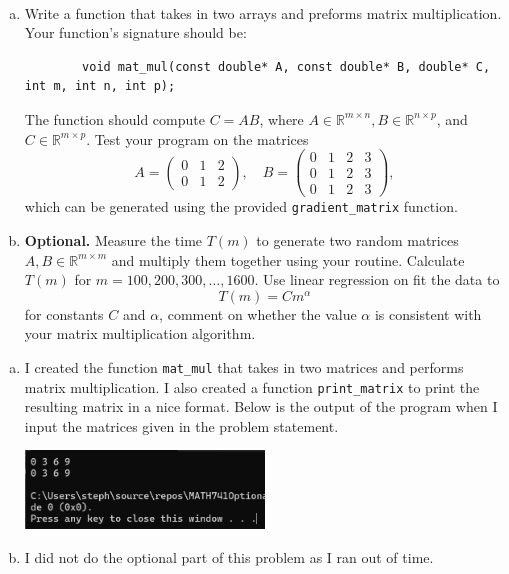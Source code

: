 \documentclass{article}
\def\rr{{\mathbb R}}
\begin{document}
\begin{problem} \\ 
    \begin{enumerate}[a)]
        \item Write a function that takes in two arrays and preforms matrix multiplication. \\
    Your function's signature should be:
    \begin{verbatim}
        void mat_mul(const double* A, const double* B, double* C, int m, int n, int p);
    \end{verbatim}
    The function should compute $C = AB$, where $A \in \rr^{m\times n}, B \in \rr^{n \times p}$, and $C \in \rr^{m \times p}$. Test your program on the matrices
    \[
        A = \begin{pmatrix}
            0 & 1 & 2 \\
            0 & 1 & 2 
        \end{pmatrix},
        \quad 
        B = \begin{pmatrix}
            0 & 1 & 2 & 3 \\
            0 & 1 & 2 & 3 \\
            0 & 1 & 2 & 3 
        \end{pmatrix},
    \]
    which can be generated using the provided \verb|gradient_matrix| function.
    \item \textbf{Optional.} Measure the time $T(m)$ to generate two random matrices $A, B \in \rr^{m\times m}$ and multiply them together using your routine. Calculate $T(m)$ for $m = 100, 200, 300, \dots , 1600$. Use linear regression on fit the data to 
    \[
        T(m) = Cm^\alpha
    \] 
    for constants $C$ and $\alpha$, comment on whether the value $\alpha$ is consistent with your matrix multiplication algorithm.
    \end{enumerate}
\end{problem}

\begin{enumerate}[a)]
    \item I created the function \verb|mat_mul| that takes in two matrices and performs matrix multiplication. I also created a function \verb|print_matrix| to print the resulting matrix in a nice format. Below is the output of the program when I input the matrices given in the problem statement. \\
    \begin{center}
        \includegraphics[width=0.5\textwidth]{OpHw1_2a.png}
    \end{center}
    \item I did not do the optional part of this problem as I ran out of time.
\end{enumerate}
\end{document}
